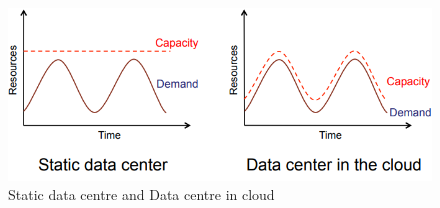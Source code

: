 \begin{figure}[h] 
\begin{center}
\includegraphics[scale=0.6]{figure/Static_data_center_Data_center_in_cloud.png}
\end{center}
\caption{Static data centre and Data centre in cloud ~\label{static_cloud}}
\end{figure}






